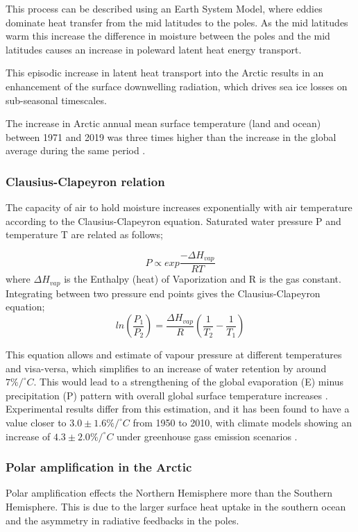 \documentclass[12pt, oneside]{article}
\begin{document}
This process can be described using an Earth System Model, where eddies dominate heat transfer from the mid latitudes to the poles. As the mid latitudes warm this increase the difference in moisture between the poles and the mid latitudes causes an increase in poleward latent heat energy transport. 

This episodic increase in latent heat transport into the Arctic results in an enhancement of the surface downwelling radiation, which drives sea ice losses on sub-seasonal timescales. 

The increase in Arctic annual mean surface temperature (land and
ocean) between 1971 and 2019 was three times
higher than the increase in the global average
during the same period \cite{amap}. 
\subsubsection{Clausius-Clapeyron relation}\label{cc}
The capacity of air to hold moisture increases exponentially with air temperature according to the Clausius-Clapeyron equation. Saturated water pressure P and temperature T are related as follows;

\begin{equation}
    P \propto exp\frac{-\Delta H_{vap}}{RT}
\end{equation}
where $\Delta H_{vap}$  is the Enthalpy (heat) of Vaporization and R is the gas constant. Integrating between two pressure end points gives the Clausius-Clapeyron equation;  
\begin{equation}
    ln \left ( \frac{P_1}{P_2} \right ) = \frac{\Delta H_{vap}}{R} \left ( \frac{1}{T_2} - \frac{1}{T_1} \right )
\end{equation}

This equation allows and estimate of vapour pressure at different temperatures and visa-versa, which simplifies to an increase of water retention by around $7\% / ^{\circ} C $. This would lead to a strengthening of the global evaporation (E) minus precipitation (P) pattern with overall global surface temperature increases \cite{held2006robust}. Experimental results differ from this estimation, and it has been found to have a value closer to $3.0 \pm 1.6 \% / ^{\circ} C $ from 1950 to 2010, with climate models showing an increase of $4.3 \pm 2.0 \% / ^{\circ} C $ under greenhouse gass emission scenarios \cite{Skliris2016}. 

\subsubsection{Polar amplification in the Arctic}
Polar amplification effects the Northern Hemisphere more than the Southern Hemisphere. This is due to the larger surface heat uptake in the southern ocean and the asymmetry in radiative feedbacks in the poles. 
\end{document}
